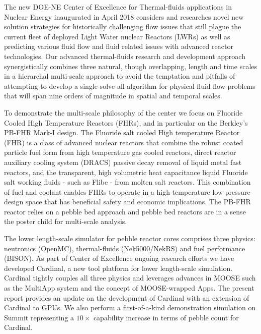 
The new DOE-NE Center of Excellence for Thermal-fluids applications in Nuclear Energy inaugurated in April 2018 considers and researches novel new solution strategies for historically challenging flow issues that still plague the current fleet of deployed Light Water nuclear Reactors (LWRs) as well as predicting various fluid flow and fluid related issues with advanced reactor technologies. 
Our advanced thermal-fluids research and development approach synergistically combines three natural, though overlapping, length and time scales in a hierarchal multi-scale approach to avoid the temptation and pitfalls of attempting to develop a single solve-all algorithm for physical fluid flow problems that will span nine orders of magnitude in spatial and temporal scales.

To demonstrate the multi-scale philosophy of the center we focus on Fluoride Cooled High Temperature Reactors (FHRs), and in particular on the Berkley's PB-FHR Mark-I design. 
The Fluoride salt cooled High temperature Reactor (FHR) is a class of advanced nuclear reactors that combine the robust coated particle fuel form from high temperature gas cooled reactors, direct reactor auxiliary cooling system (DRACS) passive decay removal of liquid metal fast reactors, and the transparent, high volumetric heat capacitance liquid Fluoride salt working fluids - such as Flibe - from molten salt reactors. 
This combination of fuel and coolant enables FHRs to operate in a high-temperature low-pressure design space that has beneficial safety and economic implications. 
The PB-FHR reactor relies on a pebble bed approach and pebble bed reactors are in a sense the poster child for multi-scale analysis.

The lower length-scale simulator for pebble reactor cores comprises three physics: neutronics (OpenMC), thermal-fluids (Nek5000/NekRS) and fuel performance (BISON). 
As part of Center of Excellence ongoing research efforts we have developed Cardinal, a new tool platform for lower length-scale simulation. 
Cardinal tightly couples all three physics and leverages advances in MOOSE such as the MultiApp system and the concept of MOOSE-wrapped Apps. 
The present report provides an update on the development of Cardinal with an extension of Cardinal to GPUs. 
We also perform a first-of-a-kind demonstration simulation on Summit representing a $10\times$ capability increase in terms of pebble count for Cardinal.
